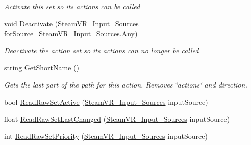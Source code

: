 \begin{DoxyCompactItemize}
\begin{DoxyCompactList}\small\item\em Activate this set so its actions can be called \end{DoxyCompactList}\item 
void \mbox{\hyperlink{class_valve_1_1_v_r_1_1_steam_v_r___action_set___data_ab1c62e54114fb68c3f6c8f5a80f96cc8}{Deactivate}} (\mbox{\hyperlink{namespace_valve_1_1_v_r_a82e5bf501cc3aa155444ee3f0662853f}{Steam\+V\+R\+\_\+\+Input\+\_\+\+Sources}} for\+Source=\mbox{\hyperlink{namespace_valve_1_1_v_r_a82e5bf501cc3aa155444ee3f0662853faed36a1ef76a59ee3f15180e0441188ad}{Steam\+V\+R\+\_\+\+Input\+\_\+\+Sources.\+Any}})
\begin{DoxyCompactList}\small\item\em Deactivate the action set so its actions can no longer be called \end{DoxyCompactList}\item 
string \mbox{\hyperlink{class_valve_1_1_v_r_1_1_steam_v_r___action_set___data_a6e9b13d26ad3b0743b76564e76a60ffc}{Get\+Short\+Name}} ()
\begin{DoxyCompactList}\small\item\em Gets the last part of the path for this action. Removes \char`\"{}actions\char`\"{} and direction. \end{DoxyCompactList}\item 
bool \mbox{\hyperlink{class_valve_1_1_v_r_1_1_steam_v_r___action_set___data_a24bdfaf2e0d0505b09055633ac7cfbc3}{Read\+Raw\+Set\+Active}} (\mbox{\hyperlink{namespace_valve_1_1_v_r_a82e5bf501cc3aa155444ee3f0662853f}{Steam\+V\+R\+\_\+\+Input\+\_\+\+Sources}} input\+Source)
\item 
float \mbox{\hyperlink{class_valve_1_1_v_r_1_1_steam_v_r___action_set___data_a86331a88d9eddc152fccc295a6c090d6}{Read\+Raw\+Set\+Last\+Changed}} (\mbox{\hyperlink{namespace_valve_1_1_v_r_a82e5bf501cc3aa155444ee3f0662853f}{Steam\+V\+R\+\_\+\+Input\+\_\+\+Sources}} input\+Source)
\item 
int \mbox{\hyperlink{class_valve_1_1_v_r_1_1_steam_v_r___action_set___data_af564cf8c2a12fe9bfab5b801db820f84}{Read\+Raw\+Set\+Priority}} (\mbox{\hyperlink{namespace_valve_1_1_v_r_a82e5bf501cc3aa155444ee3f0662853f}{Steam\+V\+R\+\_\+\+Input\+\_\+\+Sources}} input\+Source)
\end{DoxyCompactItemize}
